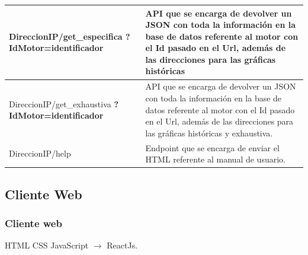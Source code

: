 \documentclass{beamer}
\begin{document}
\begin{frame}
\begin{table}
\begin{center}
{\begin{tabular}{|p{4.8cm}|p{5.4cm}|}
                DireccionIP/get\_especifica \textbf{?IdMotor=identificador}&
                API que se encarga de devolver un JSON con toda la información
                en la base de datos referente al motor con el Id pasado en el
                Url, además de las direcciones para las gráficas históricas
                \\\hline
                DireccionIP/get\_exhaustiva \textbf{?IdMotor=identificador}&
                API que se encarga de devolver un JSON con toda la información
                en la base de datos referente al motor con el Id pasado en el
                Url, además de las direcciones para las gráficas históricas
                y exhaustiva.
                \\\hline
                DireccionIP/help&
                Endpoint que se encarga de enviar el HTML referente al manual
                de usuario.\\\hline
            \end{tabular}
            }
        \end{center}
    \end{table}
\end{frame}



\subsection{Cliente Web}
\begin{frame}
    \frametitle{Cliente web}
    \large
    HTML\break \pause
    \vfill
    CSS \break \pause
    \vfill
    JavaScript $\rightarrow$ ReactJs.
\end{frame}
\end{document}
